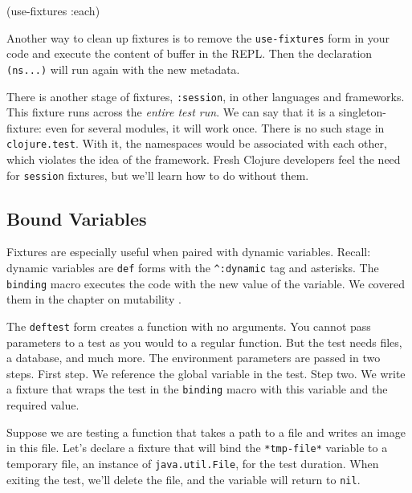 \begin{english}
  \begin{clojure}
(use-fixtures :each)
  \end{clojure}
\end{english}

Another way to clean up fixtures is to remove the \verb|use-fixtures| form in your code and execute the content of buffer in the REPL. Then the declaration \verb|(ns...)| will run again with the new metadata.

There is another stage of fixtures, \verb|:session|, in other languages and frameworks. This fixture runs across the \emph{entire test run}. We can say that it is a singleton-fixture: even for several modules, it will work once. There is no such stage in \verb|clojure.test|. With it, the namespaces would be associated with each other, which violates the idea of the framework. Fresh Clojure developers feel the need for \verb|session| fixtures, but we'll learn how to do without them.

\subsection{Bound Variables}


Fixtures are especially useful when paired with dynamic variables. Recall: dynamic variables are \verb|def| forms with the \verb|^:dynamic| tag and asterisks. The \verb|binding| macro executes the code with the new value of the variable. We covered them in the chapter on mutability .

The \verb|deftest| form creates a function with no arguments. You cannot pass parameters to a test as you would to a regular function. But the test needs files, a database, and much more. The environment parameters are passed in two steps. First step. We reference the global variable in the test. Step two. We write a fixture that wraps the test in the \verb|binding| macro with this variable and the required value.

Suppose we are testing a function that takes a path to a file and writes an image in this file. Let's declare a fixture that will bind the \verb|*tmp-file*| variable to a temporary file, an instance of \verb|java.util.File|, for the test duration. When exiting the test, we'll delete the file, and the variable will return to \verb|nil|.



